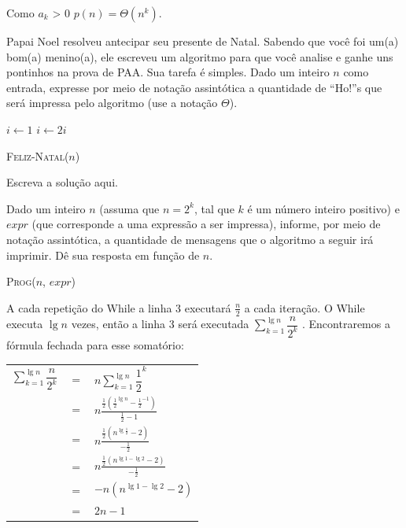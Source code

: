 \documentclass[a4paper]{exam}
\begin{document}
\begin{questions}
\begin{solution}
    Como $a_k$ > 0 \Rightarrow $p(n) = \Theta(n^k)$.
  \end{solution}
  \question Papai Noel resolveu antecipar seu presente de
  Natal. Sabendo que você foi um(a) bom(a) menino(a), ele escreveu um
  algoritmo para que você analise e ganhe uns pontinhos na prova de
  PAA. Sua tarefa é simples. Dado um inteiro $n$ como entrada,
  expresse por meio de notação assintótica a quantidade de ``Ho!''s
  que será impressa pelo algoritmo (use a notação $\Theta$).
  
  \begin{algorithm}[H]
    \NoCaptionOfAlgo
    \DontPrintSemicolon

    $i \leftarrow 1$\;
     {
      $i \leftarrow 2i$\;
    }
    \caption{\textsc{Feliz-Natal}($n$)}
  \end{algorithm}
  \begin{solution}
    Escreva a solução aqui.
  \end{solution}
  \question Dado um inteiro $n$ (assuma que $n=2^k$, tal que
  $k$ é um número inteiro positivo) e $expr$ (que corresponde a uma
  expressão a ser impressa), informe, por meio de notação assintótica,
  a quantidade de mensagens que o algoritmo a seguir irá
  imprimir. Dê sua resposta em função de $n$.

  \begin{algorithm}[H]
    \NoCaptionOfAlgo
    \DontPrintSemicolon

    \caption{\textsc{Prog}($n$, $expr$)}
  \end{algorithm}
  \begin{solution}
    A cada repetição do While a linha 3 executará $\frac{n}{2}$ a cada iteração. O While executa $\lg n$ vezes,
    então a linha 3 será executada $\displaystyle\sum_{k=1}^{\lg n} \dfrac{n}{2^k}$ . Encontraremos a fórmula fechada
    para esse somatório:\\
    \begin{tabular}{lll}
      $ \displaystyle\sum_{k=1}^{\lg n} \dfrac{n}{2^k} $&  $=$ &$ n\displaystyle\sum_{k=1}^{\lg n} {\dfrac{1}{2}}^k $ \\
      {}& $=$ &$ n\frac{\frac{1}{2}({\frac{1}{2}}^{\lg n} - {\frac{1}{2}}^{-1})}{\frac{1}{2} - 1}$ \\
      {}& $=$ &$ n\frac{\frac{1}{2}({n}^{\lg {\frac{1}{2}}} - {2})}{-\frac{1}{2}}$ \\
      {}& $=$ &$ n\frac{\frac{1}{2}({n}^{\lg 1 - \lg 2} - {2})}{-\frac{1}{2}}$ \\
      {}& $=$ &$ -n({n^{{\lg 1} - {\lg 2}}} - 2)$ \\
      {}& $=$ &$ 2n -1$ \\
    \end{tabular}


\end{solution}
\end{questions}
\end{document}
